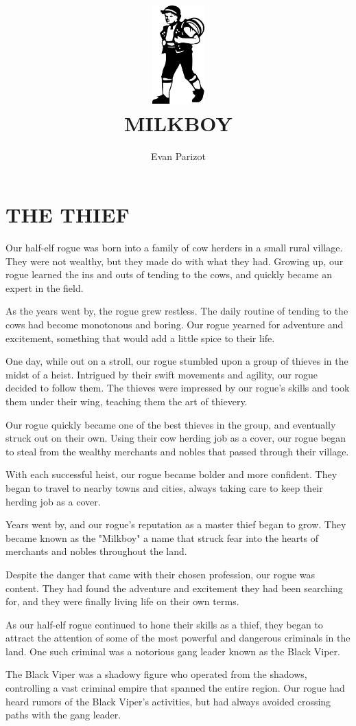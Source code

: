 \documentclass[ms,a4paper]{memoir}
\title{\includegraphics[width=2cm]{MILKBOY.png}\\[2cm]MILKBOY}
\author{Evan Parizot}
\date{}
\newcommand{\RED}[1]{\textcolor{red!50!black}{\MakeUppercase{#1}}}
\begin{document}
\maketitle
\chapter{\RED{The Thief}}

Our half-elf rogue was born into a family of cow herders in a small rural 
village. They were not wealthy, but they made do with what they had. Growing 
up, our rogue learned the ins and outs of tending to the cows, and quickly 
became an expert in the field.

As the years went by, the rogue grew restless. The daily routine of tending to 
the cows had become monotonous and boring. Our rogue yearned for adventure and 
excitement, something that would add a little spice to their life.

One day, while out on a stroll, our rogue stumbled upon a group of thieves in 
the midst of a heist. Intrigued by their swift movements and agility, our rogue 
decided to follow them. The thieves were impressed by our rogue's skills and 
took them under their wing, teaching them the art of thievery.

Our rogue quickly became one of the best thieves in the group, and eventually 
struck out on their own. Using their cow herding job as a cover, our rogue 
began to steal from the wealthy merchants and nobles that passed through their village.

With each successful heist, our rogue became bolder and more confident. They 
began to travel to nearby towns and cities, always taking care to keep their 
herding job as a cover.

Years went by, and our rogue's reputation as a master thief began to grow. They 
became known as the "Milkboy" a name that struck fear into the hearts of 
merchants and nobles throughout the land.

Despite the danger that came with their chosen profession, our rogue was content. 
They had found the adventure and excitement they had been searching for, and they 
were finally living life on their own terms.

As our half-elf rogue continued to hone their skills as a thief, they began to 
attract the attention of some of the most powerful and dangerous criminals in the
 land. One such criminal was a notorious gang leader known as the Black Viper.

The Black Viper was a shadowy figure who operated from the shadows, controlling 
a vast criminal empire that spanned the entire region. Our rogue had heard rumors
 of the Black Viper's activities, but had always avoided crossing paths with 
 the gang leader.
\end{document}
